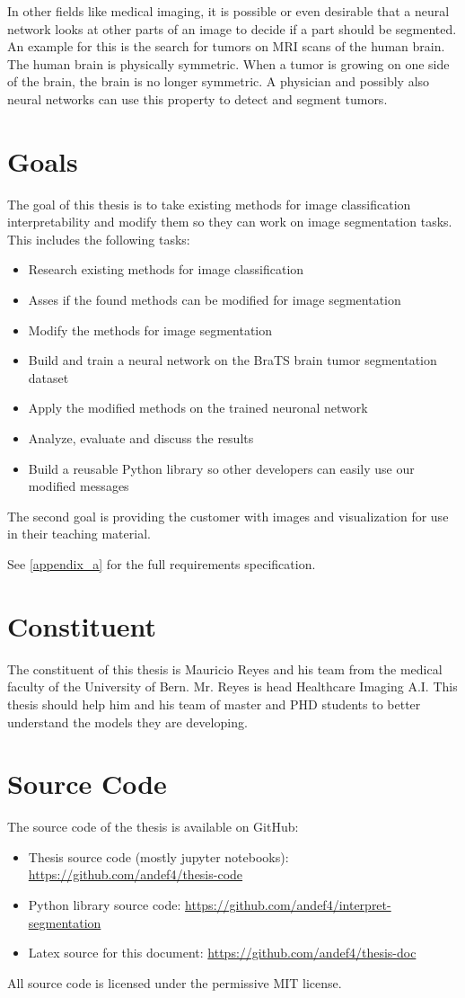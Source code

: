 In other fields like medical imaging, it is possible or even desirable that a neural network looks at other parts of an image to decide if a part should be segmented. An example for this is the search for tumors on MRI scans of the human brain. The human brain is physically symmetric. When a tumor is growing on one side of the brain, the brain is no longer symmetric. A physician and possibly also neural networks can use this property to detect and segment tumors.

\section{Goals}
The goal of this thesis is to take existing methods for image classification interpretability and modify them so they can work on image segmentation tasks. This includes the following tasks:
\begin{itemize}
    \item Research existing methods for image classification
    \item Asses if the found methods can be modified for image segmentation
    \item Modify the methods for image segmentation
    \item Build and train a neural network on the BraTS brain tumor segmentation dataset
    \item Apply the modified methods on the trained neuronal network
    \item Analyze, evaluate and discuss the results
    \item Build a reusable Python library so other developers can easily use our modified messages
\end{itemize}

The second goal is providing the customer with images and visualization for use in their teaching material.

See \autoref{appendix_a} for the full requirements specification.

\section{Constituent}
The constituent of this thesis is Mauricio Reyes and his team from the medical faculty of the University of Bern. Mr. Reyes is head Healthcare Imaging A.I. This thesis should help him and his team of master and PHD students to better understand the models they are developing.

\section{Source Code}
The source code of the thesis is available on GitHub:
\begin{itemize}
    \item Thesis source code (mostly jupyter notebooks): \url{https://github.com/andef4/thesis-code}
    \item Python library source code: \url{https://github.com/andef4/interpret-segmentation}
    \item Latex source for this document: \url{https://github.com/andef4/thesis-doc}
\end{itemize}

All source code is licensed under the permissive MIT license.
